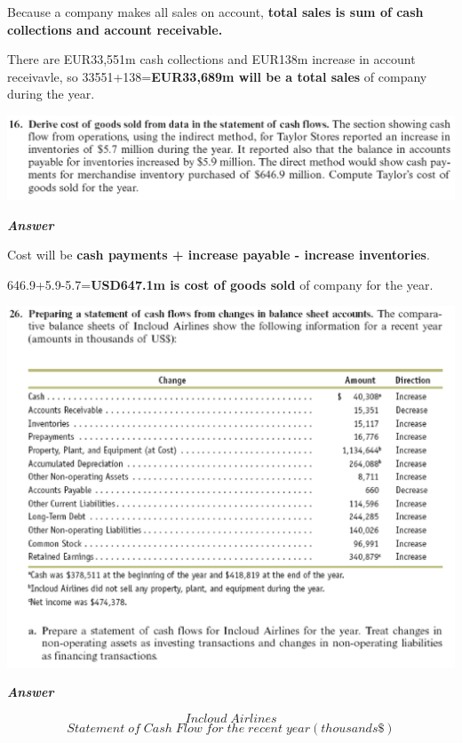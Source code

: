 \documentclass[
  letterpaper,
  DIV=11,
  numbers=noendperiod]{scrreprt}
\begin{document}
Because a company makes all sales on account, \textbf{total sales is sum
of cash collections and account receivable.}

There are EUR33,551m cash collections and EUR138m increase in account
receivavle, so 33551+138=\textbf{EUR33,689m will be a total sales} of
company during the year.

\includegraphics{images/재무회계_6-16.png}

\textbf{\emph{Answer}}

Cost will be \textbf{cash payments + increase payable - increase
inventories}.

646.9+5.9-5.7=\textbf{USD647.1m is cost of goods sold} of company for
the year.

\includegraphics{images/재무회계_6-26.png}

\textbf{\emph{Answer}}

\[Incloud\;Airlines\]
\[Statement\;of\;Cash\;Flow\;for\;the\;recent\;year(thousands\$)\]
\end{document}
